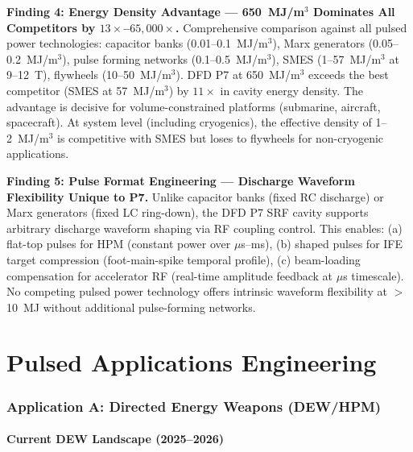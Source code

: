 \documentclass[11pt]{article}
\begin{document}
\begin{tcolorbox}[colback=blue!5!white, colframe=blue!60!black,
  title=\textbf{W4i10 P7 --- Top 5 Findings}]
\textbf{Finding 4: Energy Density Advantage --- 650~MJ/m$^3$ Dominates All Competitors by $13\times$--$65{,}000\times$.}
Comprehensive comparison against all pulsed power technologies:
capacitor banks (0.01--0.1~MJ/m$^3$), Marx generators (0.05--0.2~MJ/m$^3$),
pulse forming networks (0.1--0.5~MJ/m$^3$), SMES (1--57~MJ/m$^3$ at 9--12~T),
flywheels (10--50~MJ/m$^3$). DFD P7 at 650~MJ/m$^3$ exceeds the best
competitor (SMES at 57~MJ/m$^3$) by $11\times$ in cavity energy density.
The advantage is decisive for volume-constrained platforms (submarine,
aircraft, spacecraft). At system level (including cryogenics), the
effective density of 1--2~MJ/m$^3$ is competitive with SMES but loses to
flywheels for non-cryogenic applications.

\textbf{Finding 5: Pulse Format Engineering --- Discharge Waveform Flexibility Unique to P7.}
Unlike capacitor banks (fixed RC discharge) or Marx generators (fixed
LC ring-down), the DFD P7 SRF cavity supports arbitrary discharge
waveform shaping via RF coupling control. This enables: (a) flat-top
pulses for HPM (constant power over $\mu$s--ms), (b) shaped pulses for
IFE target compression (foot-main-spike temporal profile), (c) beam-loading
compensation for accelerator RF (real-time amplitude feedback at $\mu$s
timescale). No competing pulsed power technology offers intrinsic waveform
flexibility at $>$10~MJ without additional pulse-forming networks.

\end{tcolorbox}

\part{Pulsed Applications Engineering}
\label{part:applications}

\section{Application A: Directed Energy Weapons (DEW/HPM)}
\label{sec:DEW}

\subsection{Current DEW Landscape (2025--2026)}
\end{document}

